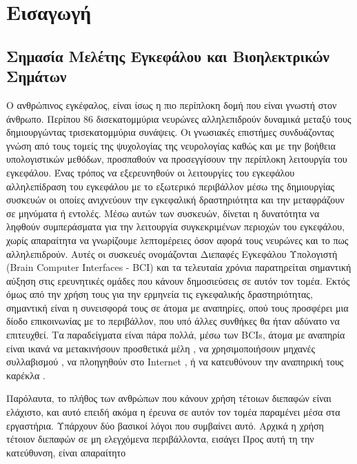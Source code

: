 \documentclass[11pt,a4paper,english,greek,twoside]{../Thesis}
\begin{document}
\chapter{Εισαγωγή}
\section{Σημασία Μελέτης Εγκεφάλου και Βιοηλεκτρικών Σημάτων}
Ο ανθρώπινος εγκέφαλος, είναι ίσως η πιο περίπλοκη δομή που είναι γνωστή στον άνθρωπο. Περίπου 86 δισεκατομμύρια νευρώνες \cite{Herculano-Houzel2009TheBrain} αλληλεπιδρούν δυναμικά μεταξύ τους δημιουργώντας τρισεκατομμύρια συνάψεις. Οι γνωσιακές επιστήμες συνδυάζοντας γνώση από τους τομείς της ψυχολογίας της νευρολογίας καθώς και με την βοήθεια υπολογιστικών μεθόδων, προσπαθούν να προσεγγίσουν την περίπλοκη λειτουργία του εγκεφάλου. Ένας τρόπος να εξερευνηθούν οι λειτουργίες του εγκεφάλου αλληλεπίδραση του εγκεφάλου με το εξωτερικό περιβάλλον μέσω της δημιουργίας συσκευών οι οποίες ανιχνεύουν την εγκεφαλική δραστηριότητα και την μεταφράζουν σε μηνύματα ή εντολές. Μέσω αυτών των συσκευών, δίνεται η δυνατότητα να ληφθούν συμπεράσματα για την λειτουργία συγκεκριμένων περιοχών του εγκεφάλου, χωρίς απαραίτητα να γνωρίζουμε λεπτομέρειες όσον αφορά τους νευρώνες και το πως αλληλεπιδρούν. Αυτές οι συσκευές ονομάζονται Διεπαφές Εγκεφάλου Υπολογιστή (Brain Computer Interfaces - BCI) και τα τελευταία χρόνια παρατηρείται σημαντική αύξηση στις ερευνητικές ομάδες που κάνουν δημοσιεύσεις σε αυτόν τον τομέα. Εκτός όμως από την χρήση τους για την ερμηνεία τις εγκεφαλικής δραστηριότητας, σημαντική είναι η συνεισφορά τους σε άτομα με αναπηρίες, οπού τους προσφέρει μια δίοδο επικοινωνίας με το περιβάλλον, που υπό άλλες συνθήκες θα ήταν αδύνατο να επιτευχθεί. Τα παραδείγματα είναι πάρα πολλά, μέσω των BCIs, άτομα με αναπηρία είναι ικανά να μετακινήσουν προσθετικά μέλη \cite{}, να χρησιμοποιήσουν μηχανές συλλαβισμού \cite{Farwell1988TalkingPotentials}, να πλοηγηθούν στο Internet \cite{}, ή να κατευθύνουν την αναπηρική τους καρέκλα \cite{}.
\par Παρόλαυτα, το πλήθος των ανθρώπων που κάνουν χρήση τέτοιων διεπαφών είναι ελάχιστο, και αυτό επειδή ακόμα η έρευνα σε αυτόν τον τομέα παραμένει μέσα στα εργαστήρια. Υπάρχουν δύο βασικοί λόγοι που συμβαίνει αυτό. Αρχικά η χρήση τέτοιον διεπαφών σε μη ελεγχόμενα περιβάλλοντα, εισάγει   Προς αυτή τη την κατεύθυνση, είναι απαραίτητο 



\end{document}
